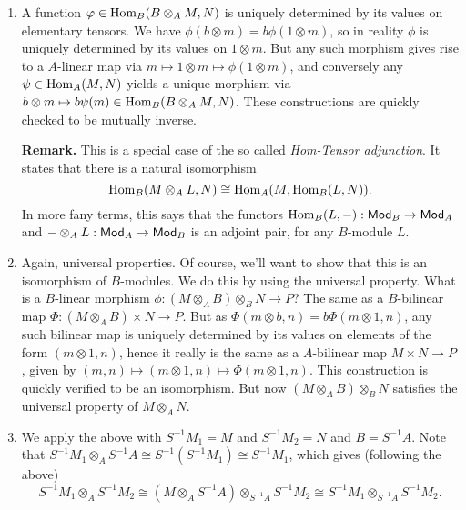 \documentclass[a4paper,11pt]{article}
\begin{document}
\begin{enumerate}
    \item A function $\varphi \in \operatorname{Hom}_B(B \otimes_A M , N)$ is uniquely determined
        by its values on elementary tensors. We have $\phi(b \otimes m) = 
        b \phi(1 \otimes m)$, so in reality $\phi$ is uniquely determined by 
        its values on $1 \otimes m$. But any such morphism gives rise to 
        a $A$-linear map via $m \mapsto 1\otimes m \mapsto \phi(1 \otimes m)$, 
        and conversely any $\psi \in \operatorname{Hom}_A(M,N)$ yields a unique morphism
        via $b \otimes m \mapsto b \psi(m) \in \operatorname{Hom}_B(B \otimes_A M, N)$. 
        These constructions are quickly checked to be mutually inverse.

        \textbf{Remark.} This is a special case of the so called 
        \textit{Hom-Tensor adjunction}. It states that there is a 
        natural isomorphism
        \begin{equation*}
            \operatorname{Hom}_B(M \otimes_A L, N) \cong \operatorname{Hom}_A(M, \operatorname{Hom}_B(L,N)).
        \end{equation*}
        In more fany terms, this says that the functors
        $\operatorname{Hom}_B(L, -): \textnormal{$\textsf{Mod}$}_B \to \textnormal{$\textsf{Mod}$}_A$ and $- \otimes_A L: \textnormal{$\textsf{Mod}$}_A
        \to \textnormal{$\textsf{Mod}$}_B$ is an adjoint pair, for any $B$-module $L$.

    \item Again, universal properties. Of course, we'll want to show that this
        is an isomorphism of $B$-modules. We do this by using the universal property.
        What is a $B$-linear morphism $\phi: (M \otimes_A B) \otimes_B N 
        \to P$? The same as a $B$-bilinear map $\Phi: (M \otimes_A B) \times N 
        \to P$. But as $\Phi(m \otimes b, n) = b \Phi(m \otimes 1, n)$, any
        such bilinear map is uniquely determined by its values on elements of 
        the form $(m \otimes 1 , n)$, hence it really is the same as a
        $A$-bilinear map $M \times N \to P$, given by
        $(m,n) \mapsto (m \otimes 1, n) \mapsto \Phi(m \otimes 1, n)$.
        This construction is quickly verified to be an isomorphism. But now
        $(M \otimes_A B) \otimes_B N$ satisfies the universal property of $M
        \otimes_A N$. 

    \item We apply the above with $S^{-1}M_1 = M$ and $S^{-1}M_2 = N$ and
        $B = S^{-1}A$. Note that $S^{-1}M_1 \otimes_A S^{-1}A \cong 
        S^{-1}(S^{-1}M_1) \cong S^{-1}M_1$, which gives (following the above)
        \begin{equation*}
            S^{-1}M_1 \otimes_A S^{-1}M_2 \cong
            (M \otimes_A S^{-1}A) \otimes_{S^{-1}A} S^{-1}M_2 \cong
            S^{-1}M_1 \otimes_{S^{-1} A} S^{-1}M_2.
        \end{equation*}
\end{enumerate}
\end{document}
